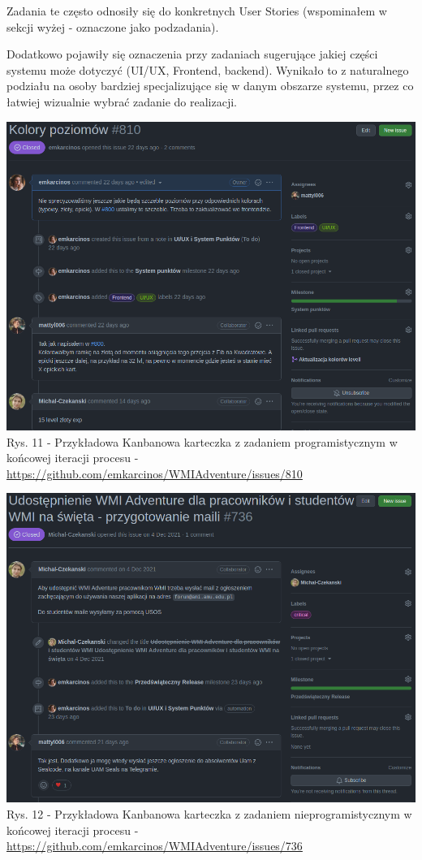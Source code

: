 \documentclass{article}
\begin{document}
Zadania te często odnosiły się do konkretnych User Stories (wspominałem w sekcji wyżej - oznaczone jako podzadania).

Dodatkowo pojawiły się oznaczenia przy zadaniach sugerujące jakiej części systemu może dotyczyć (UI/UX, Frontend, backend). Wynikało to z naturalnego podziału na osoby bardziej specjalizujące się w danym obszarze systemu, przez co łatwiej wizualnie wybrać zadanie do realizacji.

\begin{center}
    \includegraphics[scale=0.5]{card_implementation_task_example.png}
    \newline
    Rys. 11 - Przykładowa Kanbanowa karteczka z zadaniem programistycznym w końcowej iteracji procesu - \url{https://github.com/emkarcinos/WMIAdventure/issues/810}
\end{center}
\begin{center}
    \includegraphics[scale=0.5]{card_other_task_example.png}
    \newline
    Rys. 12 - Przykładowa Kanbanowa karteczka z zadaniem nieprogramistycznym w końcowej iteracji procesu - \url{https://github.com/emkarcinos/WMIAdventure/issues/736}
\end{center}
\end{document}
